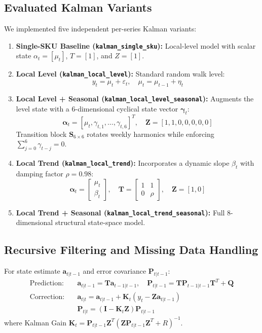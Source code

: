 \documentclass[11pt,a4paper]{article}
\begin{document}
\subsection{Evaluated Kalman Variants}
We implemented five independent per-series Kalman variants:
\begin{enumerate}
    \item \textbf{Single-SKU Baseline (\texttt{kalman\_single\_sku}):} Local-level model with scalar state $\alpha_t = [\mu_t]$, $T = [1]$, and $Z = [1]$.
    \item \textbf{Local Level (\texttt{kalman\_local\_level}):} Standard random walk level:
    \begin{equation}
    y_t = \mu_t + \varepsilon_t, \quad \mu_t = \mu_{t-1} + \eta_t
    \end{equation}
    \item \textbf{Local Level + Seasonal (\texttt{kalman\_local\_level\_seasonal}):} Augments the level state with a 6-dimensional cyclical state vector $\boldsymbol{\gamma}_t$:
    \begin{equation}
    \boldsymbol{\alpha}_t = [\mu_t, \gamma_{t,1}, \dots, \gamma_{t,6}]^T, \quad \mathbf{Z} = [1, 1, 0, 0, 0, 0, 0]
    \end{equation}
    Transition block $\mathbf{S}_{6 \times 6}$ rotates weekly harmonics while enforcing $\sum_{j=0}^6 \gamma_{t-j} = 0$.
    \item \textbf{Local Trend (\texttt{kalman\_local\_trend}):} Incorporates a dynamic slope $\beta_t$ with damping factor $\rho = 0.98$:
    \begin{equation}
    \boldsymbol{\alpha}_t = \begin{bmatrix} \mu_t \\ \beta_t \end{bmatrix}, \quad \mathbf{T} = \begin{bmatrix} 1 & 1 \\ 0 & \rho \end{bmatrix}, \quad \mathbf{Z} = [1, 0]
    \end{equation}
    \item \textbf{Local Trend + Seasonal (\texttt{kalman\_local\_trend\_seasonal}):} Full 8-dimensional structural state-space model.
\end{enumerate}

\subsection{Recursive Filtering and Missing Data Handling}
For state estimate $\mathbf{a}_{t|t-1}$ and error covariance $\mathbf{P}_{t|t-1}$:
\begin{align}
\text{Prediction:} \quad &\mathbf{a}_{t|t-1} = \mathbf{T} \mathbf{a}_{t-1|t-1}, \quad \mathbf{P}_{t|t-1} = \mathbf{T} \mathbf{P}_{t-1|t-1} \mathbf{T}^T + \mathbf{Q} \\
\text{Correction:} \quad &\mathbf{a}_{t|t} = \mathbf{a}_{t|t-1} + \mathbf{K}_t (y_t - \mathbf{Z} \mathbf{a}_{t|t-1}) \\
&\mathbf{P}_{t|t} = (\mathbf{I} - \mathbf{K}_t \mathbf{Z}) \mathbf{P}_{t|t-1}
\end{align}
where Kalman Gain $\mathbf{K}_t = \mathbf{P}_{t|t-1} \mathbf{Z}^T (\mathbf{Z} \mathbf{P}_{t|t-1} \mathbf{Z}^T + R)^{-1}$.
\end{document}
